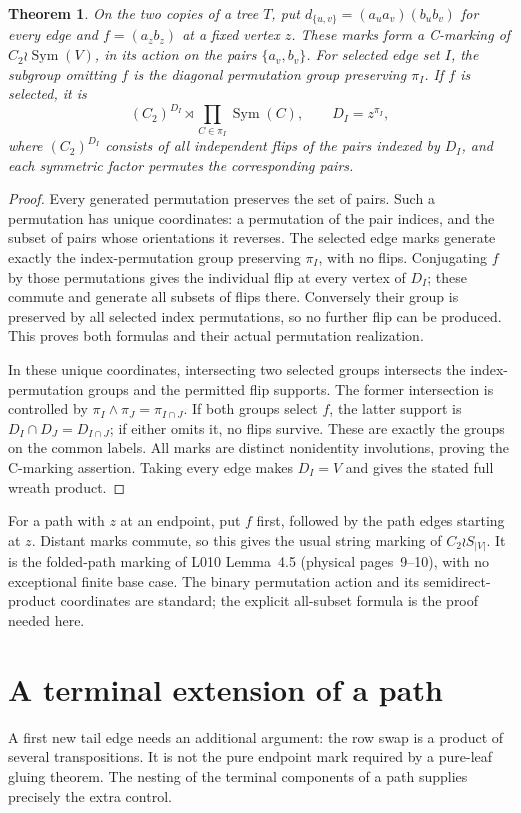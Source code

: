 \documentclass[a4paper,11pt]{article}
\newcommand{\Sym}{\operatorname{Sym}}
\newtheorem{theorem}{Theorem}\newtheorem{lemma}[theorem]{Lemma}\newtheorem{corollary}[theorem]{Corollary}
\begin{document}
\begin{theorem}\label{thm:binary}
On the two copies of a tree $T$, put
$d_{\{u,v\}}=(a_u a_v)(b_u b_v)$ for every edge and
$f=(a_zb_z)$ at a fixed vertex $z$. These marks form a C-marking of
$C_2\wr\Sym(V)$, in its action on the pairs $\{a_v,b_v\}$.
For selected edge set $I$, the subgroup omitting $f$ is the diagonal
permutation group preserving $\pi_I$. If $f$ is selected, it is
\[
 (C_2)^{D_I}\rtimes\prod_{C\in\pi_I}\Sym(C),
 \qquad D_I=z^{\pi_I},
\]
where $(C_2)^{D_I}$ consists of all independent flips of the pairs indexed
by $D_I$, and each symmetric factor permutes the corresponding pairs.
\end{theorem}
\begin{proof}
Every generated permutation preserves the set of pairs. Such a permutation
has unique coordinates: a permutation of the pair indices, and the subset
of pairs whose orientations it reverses. The selected edge marks generate
exactly the index-permutation group preserving $\pi_I$, with no flips.
Conjugating $f$ by those permutations gives the individual flip at every
vertex of $D_I$; these commute and generate all subsets of flips there.
Conversely their group is preserved by all selected index permutations,
so no further flip can be produced. This proves both formulas and their
actual permutation realization.

In these unique coordinates, intersecting two selected groups intersects
the index-permutation groups and the permitted flip supports. The former
intersection is controlled by $\pi_I\wedge\pi_J=\pi_{I\cap J}$.
If both groups select $f$, the latter support is
$D_I\cap D_J=D_{I\cap J}$; if either omits it, no flips survive.
These are exactly the groups on the common labels. All marks are distinct
nonidentity involutions, proving the C-marking assertion. Taking every edge
makes $D_I=V$ and gives the stated full wreath product.
\end{proof}

For a path with $z$ at an endpoint, put $f$ first, followed by the path
edges starting at $z$. Distant marks commute, so this gives the usual
string marking of $C_2\wr S_{|V|}$. It is the folded-path marking of
L010 Lemma~4.5 (physical pages~9--10), with no exceptional finite base case.
The binary permutation action and its semidirect-product coordinates are
standard; the explicit all-subset formula is the proof needed here.

\section{A terminal extension of a path}
A first new tail edge needs an additional argument: the row swap is a product
of several transpositions. It is not the pure endpoint mark required by a
pure-leaf gluing theorem. The nesting of the terminal components of a path
supplies precisely the extra control.
\end{document}
